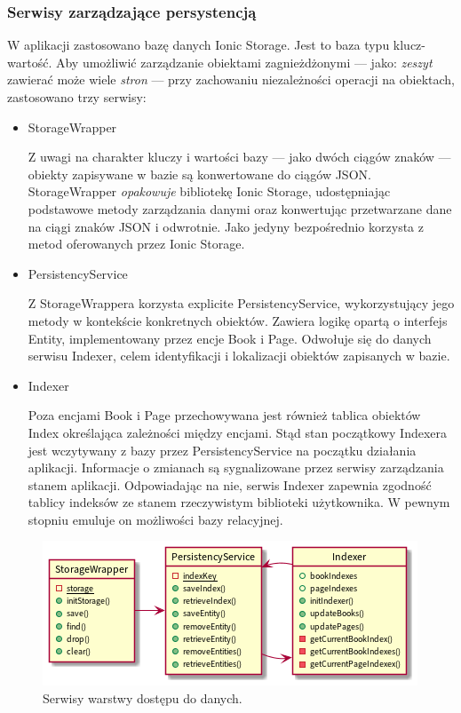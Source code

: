 \subsubsection{Serwisy zarządzające persystencją}
W aplikacji zastosowano bazę danych Ionic Storage. Jest to baza typu klucz-wartość. Aby umożliwić
zarządzanie obiektami zagnieżdżonymi — jako: \textit{zeszyt} zawierać może wiele \textit{stron} — przy zachowaniu
niezależności operacji na obiektach, zastosowano trzy serwisy:

\begin{itemize}
	\item StorageWrapper

	      Z uwagi na charakter kluczy i wartości bazy — jako dwóch ciągów znaków — obiekty zapisywane w bazie są
	      konwertowane do ciągów JSON. StorageWrapper \textit{opakowuje} bibliotekę Ionic Storage, udostępniając podstawowe
	      metody zarządzania danymi oraz konwertując przetwarzane dane na ciągi znaków JSON i odwrotnie.
	      Jako jedyny bezpośrednio korzysta z metod oferowanych przez Ionic Storage.
	\item PersistencyService

	      Z StorageWrappera korzysta explicite PersistencyService, wykorzystujący jego metody w kontekście konkretnych obiektów.
	      Zawiera logikę opartą o interfejs Entity, implementowany przez encje Book i Page. Odwołuje się do danych
	      serwisu Indexer, celem identyfikacji i lokalizacji obiektów zapisanych w bazie.
	\item Indexer

	      Poza encjami Book i Page przechowywana jest również tablica obiektów Index określająca
	      zależności między encjami. Stąd stan początkowy Indexera jest wczytywany z bazy przez PersistencyService
	      na początku działania aplikacji.
	      Informacje o zmianach są sygnalizowane przez serwisy zarządzania stanem aplikacji.
	      Odpowiadając na nie, serwis Indexer zapewnia zgodność tablicy indeksów ze stanem rzeczywistym
	      biblioteki użytkownika. W pewnym stopniu emuluje on możliwości bazy relacyjnej.
\end{itemize}

\begin{figure}[H]
	\begin{center}
		\includegraphics[scale=0.9]{media/PersistencyLayer.png}
	\end{center}
	\caption{Serwisy warstwy dostępu do danych.}
	\label{rys:persistency-layer}
\end{figure}

